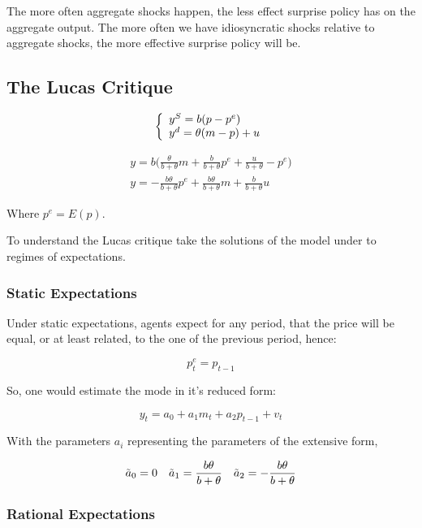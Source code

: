 The more often aggregate shocks happen, the less effect surprise policy has on the aggregate output. The more often we have idiosyncratic shocks relative to aggregate shocks, the more effective surprise policy will be. 

\subsection{The Lucas Critique}

\[ 
\left\{
\begin{array}{l l}
    y^S=b(p-p^e) \\
    y^d=\theta(m-p)+u
\end{array}
\right.
\]


\begin{align*}
    y=b \bigg( \frac{\theta}{b+\theta}m+\frac{b}{b+\theta}p^e+\frac{u}{b+\theta}-p^e \bigg) \\
    y=-\frac{b\theta}{b+\theta}p^e+\frac{b\theta}{b+\theta}m + \frac{b}{b+\theta}u
\end{align*}

Where $p^e=E(p)$. 

To understand the Lucas critique take the solutions of the model under to regimes of expectations. 

\subsubsection{Static Expectations}

Under static expectations, agents expect for any period, that the price will be equal, or at least related, to the one of the previous period, hence: 

\begin{equation*}
    p_t^e=p_{t-1}
\end{equation*}

So, one would estimate the mode in it's reduced form: 

\begin{equation*}
    y_t=a_0+a_1m_t+a_2p_{t-1}+v_t
\end{equation*}

With the parameters $a_i$ representing the parameters of the extensive form, 

\begin{align*}
    \Tilde{a}_{0}=0 && \Tilde{a}_{1}=\frac{b\theta}{b+\theta} && \Tilde{a}_2=-\frac{b\theta}{b+\theta}
\end{align*}

\subsubsection{Rational Expectations}


